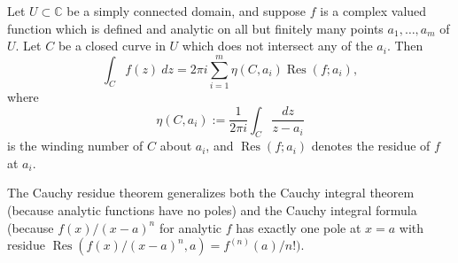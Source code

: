 \documentclass{article}
\begin{document}
Let $U \subset \mathbb{C}$ be a simply connected domain, and suppose $f$ is a complex valued function which is defined and analytic on all but finitely many points $a_1, \dots, a_m$ of $U$. Let $C$ be a closed curve in $U$ which does not intersect any of the $a_i$. Then
$$
\int_C f(z)\ dz = 2 \pi i \sum_{i=1}^m \eta(C,a_i) \operatorname{Res}(f;a_i),
$$
where
$$
\eta(C,a_i) := \frac{1}{2 \pi i} \int_C \frac{dz}{z-a_i}
$$
is the winding number of $C$ about $a_i$, and $\operatorname{Res}(f;a_i)$ denotes the residue of $f$ at $a_i$.

The Cauchy residue theorem generalizes both the Cauchy integral theorem (because analytic functions have no poles) and the Cauchy integral formula (because $f(x)/(x-a)^n$ for analytic $f$ has exactly one pole at $x=a$ with residue $\operatorname{Res}(f(x)/(x-a)^n,a) = f^{(n)}(a)/n!)$.
\end{document}
